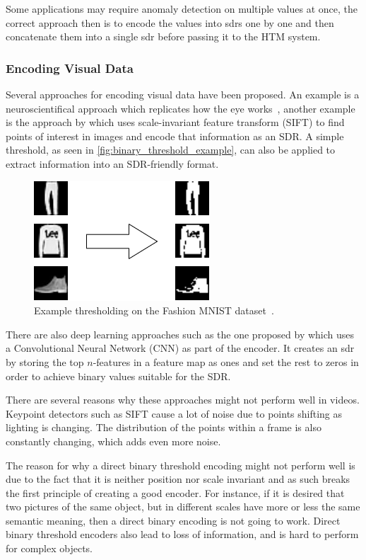 Some applications may require anomaly detection on multiple values at once, the correct approach then is to encode the values into \glspl*{sdr} one by one and then concatenate them into a single \gls*{sdr} before passing it to the HTM system.
\subsubsection{Encoding Visual Data}
Several approaches for encoding visual data have been proposed. An example is a neuroscientifical approach which replicates how the eye works~\cite{eyeencoder}, another example is the approach by \textcite{ObjectDetectionSIFT} which uses scale-invariant feature transform (SIFT) to find points of interest in images and encode that information as an SDR. A simple threshold, as seen in \autoref{fig:binary_threshold_example}, can also be applied to extract information into an SDR-friendly format.
\begin{figure}[H]
    \centering
    \includegraphics[width=0.5\linewidth]{resources/related_works/binary_threshold_example.png}
    \caption[Thresholding Example]{Example thresholding on the Fashion MNIST dataset~\cite{mnist_fashion}.}
    \label{fig:binary_threshold_example}
\end{figure}
\par
There are also deep learning approaches such as the one proposed by \textcite{CNN_HTM} which uses a Convolutional Neural Network (CNN) as part of the encoder. It creates an \gls*{sdr} by storing the top $n$-features in a feature map as ones and set the rest to zeros in order to achieve binary values suitable for the SDR.
\par
There are several reasons why these approaches might not perform well in videos. Keypoint detectors such as SIFT cause a lot of noise due to points shifting as lighting is changing. The distribution of the points within a frame is also constantly changing, which adds even more noise.
\par
The reason for why a direct binary threshold encoding might not perform well is due to the fact that it is neither position nor scale invariant and as such breaks the first principle of creating a good encoder. For instance, if it is desired that two pictures of the same object, but in different scales have more or less the same semantic meaning, then a direct binary encoding is not going to work. Direct binary threshold encoders also lead to loss of information, and is hard to perform for complex objects.
